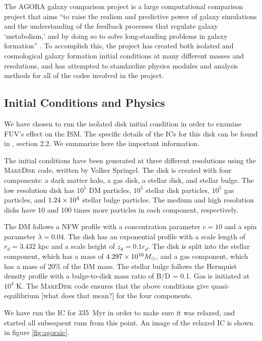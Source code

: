 The AGORA galaxy comparison project is a large computational comparison project that aims ``to raise the realism and predictive power of galaxy simulations and the understanding of the feedback processes that regulate galaxy `metabolism,' and by doing so to solve long-standing problems in galaxy formation'' \citep{kimEt14}. To accomplish this, the project has created both isolated and cosmological galaxy formation initial conditions at many different masses and resolutions, and has attempted to standardize physics modules and analysis methods for all of the codes involved in the project.

\subsection{Initial Conditions and Physics}
\label{sec:initialconditions}

We have chosen to run the isolated disk initial condition in order to examine FUV's effect on the ISM. The specific details of the ICs for this disk can be found in \citet{kimEt14}, section 2.2. We summarize here the important information.

The initial conditions have been generated at three different resolutions using the \textsc{MakeDisk} code, written by Volker Springel. The disk is created with four components: a dark matter halo, a gas disk, a stellar disk, and stellar bulge. The low resolution disk has $10^5$ DM particles, $10^5$ stellar disk particles, $10^5$ gas particles, and $1.24\times 10^{4}$ stellar bulge particles. The medium and high resolution disks have 10 and 100 times more particles in each component, respectively.

The DM follows a NFW profile \citep{navarroEt97} with a concentration parameter $c = 10$ and a spin parameter $\lambda = 0.04$. The disk has an exponential profile with a scale length of $r_d = 3.432$ kpc and a scale height of $z_d = 0.1 r_d$. The disk is split into the stellar component, which has a mass of $4.297\times 10^{10} M_{\odot}$, and a gas component, which has a mass of 20\% of the DM mass. The stellar bulge follows the Hernquist \citeyear{hernquist90} density profile with a bulge-to-disk mass ratio of B/D = 0.1. Gas is initiated at $10^4$ K. The \textsc{MakeDisk} code ensures that the above conditions give quasi-equilibrium [what does that mean?] for the four components. 

We have run the IC for 335~Myr in order to make sure it was relaxed, and started all subsequent runs from this point. An image of the relaxed IC is shown in figure \ref{fig:agoraic}.

